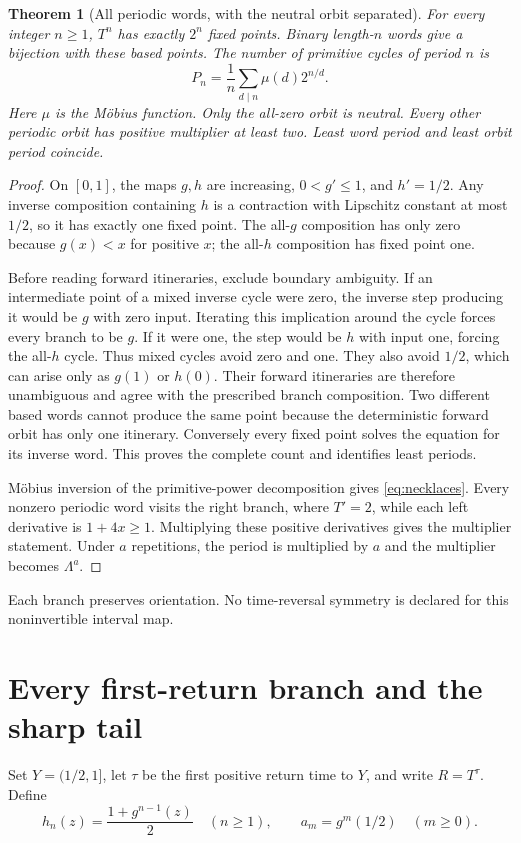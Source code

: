\documentclass[10pt]{article}
\newtheorem{theorem}{Theorem}
\begin{document}
\begin{theorem}[All periodic words, with the neutral orbit separated]
For every integer $n\ge1$, $T^n$ has exactly $2^n$ fixed points. Binary
length-$n$ words give a bijection with these based points. The number of
primitive cycles of period $n$ is
\begin{equation}
P_n=\frac1n\sum_{d\mid n}\mu(d)2^{n/d}.
\label{eq:necklaces}
\end{equation}
Here $\mu$ is the Möbius function.
Only the all-zero orbit is neutral. Every other periodic orbit has positive
multiplier at least two. Least word period and least orbit period coincide.
\end{theorem}
\begin{proof}
On $[0,1]$, the maps $g,h$ are increasing, $0<g'\le1$, and $h'=1/2$.
Any inverse composition containing $h$ is a contraction with Lipschitz
constant at most $1/2$, so it has exactly one fixed point. The all-$g$
composition has only zero because $g(x)<x$ for positive $x$; the all-$h$
composition has fixed point one.

Before reading forward itineraries, exclude boundary ambiguity. If an
intermediate point of a mixed inverse cycle were zero, the inverse step
producing it would be $g$ with zero input. Iterating this implication around
the cycle forces every branch to be $g$. If it were one, the step would
be $h$ with input one, forcing the all-$h$ cycle. Thus mixed cycles avoid
zero and one. They also avoid $1/2$, which can arise only as $g(1)$ or
$h(0)$. Their forward itineraries are therefore unambiguous and agree with
the prescribed branch composition. Two different based words cannot produce
the same point because the deterministic forward orbit has only one
itinerary. Conversely every fixed point solves the equation for its inverse
word. This proves the complete count and identifies least periods.

Möbius inversion of the primitive-power decomposition gives
\eqref{eq:necklaces}. Every nonzero periodic word visits the right branch,
where $T'=2$, while each left derivative is $1+4x\ge1$. Multiplying these
positive derivatives gives the multiplier statement. Under $a$ repetitions,
the period is multiplied by $a$ and the multiplier becomes $\Lambda^a$.
\end{proof}
Each branch preserves orientation. No time-reversal symmetry is declared
for this noninvertible interval map.

\section{Every first-return branch and the sharp tail}
Set $Y=(1/2,1]$, let $\tau$ be the first positive return time to $Y$, and
write $R=T^\tau$. Define
\begin{equation}
h_n(z)=\frac{1+g^{n-1}(z)}2\quad(n\ge1),\qquad
a_m=g^m(1/2)\quad(m\ge0).
\label{eq:branches}
\end{equation}
\end{document}
